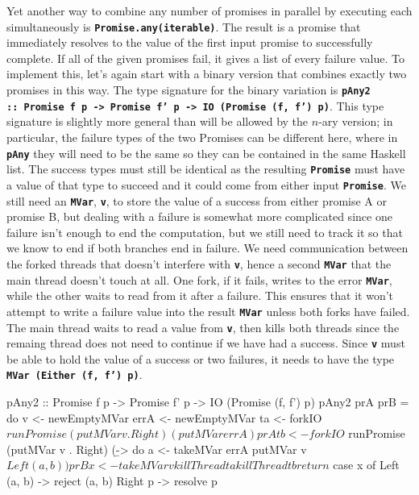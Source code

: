 \documentclass[12pt, english, letterpaper]{kuthesis}
\newcommand{\lit}[1]{\textbf{\texttt{#1}}}
\begin{document}
Yet another way to combine any number of promises in parallel by executing each simultaneously is \lit{Promise.any(iterable)}.  The result is a promise that immediately resolves to the value of the first input promise to successfully complete.  If all of the given promises fail, it gives a list of every failure value.  To implement this, let's again start with a binary version that combines exactly two promises in this way.  The type signature for the binary variation is \lit{pAny2 ::\ Promise f p -> Promise f' p -> IO (Promise (f, f') p)}.  This type signature is slightly more general than will be allowed by the \(n\)-ary version; in particular, the failure types of the two Promises can be different here, where in \lit{pAny} they will need to be the same so they can be contained in the same Haskell list.  The success types must still be identical as the resulting \lit{Promise} must have a value of that type to succeed and it could come from either input \lit{Promise}.  We still need an \lit{MVar}, \lit v, to store the value of a success from either promise A or promise B, but dealing with a failure is somewhat more complicated since one failure isn't enough to end the computation, but we still need to track it so that we know to end if both branches end in failure.  We need communication between the forked threads that doesn't interfere with \lit v, hence a second \lit{MVar} that the main thread doesn't touch at all.  One fork, if it fails, writes to the error \lit{MVar}, while the other waits to read from it after a failure.  This ensures that it won't attempt to write a failure value into the result \lit{MVar} unless both forks have failed.  The main thread waits to read a value from \lit v, then kills both threads since the remaing thread does not need to continue if we have had a success.  Since \lit v must be able to hold the value of a success or two failures, it needs to have the type \lit{MVar (Either (f, f') p)}.

\begin{code}
pAny2 :: Promise f p -> Promise f' p -> IO (Promise (f, f') p)
pAny2 prA prB = do v <- newEmptyMVar
                   errA <- newEmptyMVar
                   ta <- forkIO $ runPromise (putMVar v . Right)
                         (putMVar errA) prA
                   tb <- forkIO $ runPromise (putMVar v . Right)
                         (\b -> do a <- takeMVar errA
                                   putMVar v $ Left (a, b)) prB
                   x <- takeMVar v
                   killThread ta
                   killThread tb
                   return $ case x of
                              Left (a, b) -> reject (a, b)
                              Right p -> resolve p
\end{code}
\end{document}
